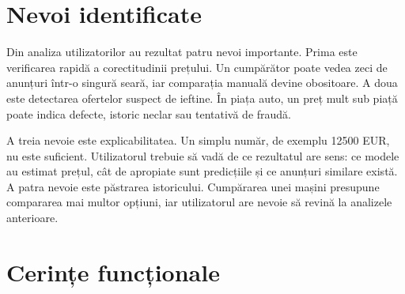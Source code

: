 \section{Nevoi identificate}
\label{sec:req-needs}

Din analiza utilizatorilor au rezultat patru nevoi importante. Prima este verificarea rapidă a corectitudinii prețului. Un cumpărător poate vedea zeci de anunțuri într-o singură seară, iar comparația manuală devine obositoare. A doua este detectarea ofertelor suspect de ieftine. În piața auto, un preț mult sub piață poate indica defecte, istoric neclar sau tentativă de fraudă.

A treia nevoie este explicabilitatea. Un simplu număr, de exemplu 12500 EUR, nu este suficient. Utilizatorul trebuie să vadă de ce rezultatul are sens: ce modele au estimat prețul, cât de apropiate sunt predicțiile și ce anunțuri similare există. A patra nevoie este păstrarea istoricului. Cumpărarea unei mașini presupune compararea mai multor opțiuni, iar utilizatorul are nevoie să revină la analizele anterioare.

\section{Cerințe funcționale}
\label{sec:req-functional}

